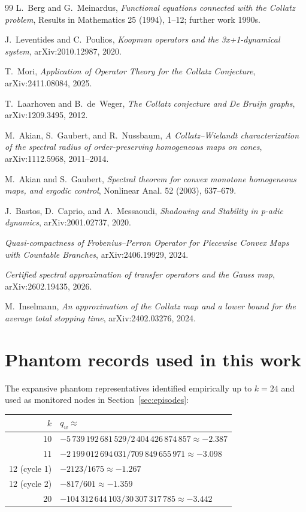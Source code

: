 \documentclass[11pt,a4paper]{article}
\theoremstyle{definition}
\begin{document}
\begin{thebibliography}{99}
L.~Berg and G.~Meinardus,
\emph{Functional equations connected with the Collatz problem},
Results in Mathematics 25 (1994), 1--12; further work 1990s.

J.~Leventides and C.~Poulios,
\emph{Koopman operators and the 3x+1-dynamical system},
arXiv:2010.12987, 2020.

T.~Mori,
\emph{Application of Operator Theory for the Collatz Conjecture},
arXiv:2411.08084, 2025.

T.~Laarhoven and B.~de~Weger,
\emph{The Collatz conjecture and De Bruijn graphs},
arXiv:1209.3495, 2012.

M.~Akian, S.~Gaubert, and R.~Nussbaum,
\emph{A Collatz--Wielandt characterization of the spectral radius
of order-preserving homogeneous maps on cones},
arXiv:1112.5968, 2011--2014.

M.~Akian and S.~Gaubert,
\emph{Spectral theorem for convex monotone homogeneous maps,
and ergodic control},
Nonlinear Anal. 52 (2003), 637--679.

J.~Bastos, D.~Caprio, and A.~Messaoudi,
\emph{Shadowing and Stability in p-adic dynamics},
arXiv:2001.02737, 2020.

\emph{Quasi-compactness of Frobenius--Perron Operator for
Piecewise Convex Maps with Countable Branches},
arXiv:2406.19929, 2024.

\emph{Certified spectral approximation of transfer operators
and the Gauss map},
arXiv:2602.19435, 2026.

M.~Inselmann,
\emph{An approximation of the Collatz map and a lower bound
for the average total stopping time},
arXiv:2402.03276, 2024.

\end{thebibliography}

\appendix

\section{Phantom records used in this work}
\label{app:phantoms}

The expansive phantom representatives identified empirically up to
$k = 24$ and used as monitored nodes in Section~\ref{sec:episodes}:

\begin{center}
\begin{tabular}{rl}
\toprule
$k$ & $q_w \approx$ \\
\midrule
10 & $-5\,739\,192\,681\,529 / 2\,404\,426\,874\,857 \approx -2.387$ \\
11 & $-2\,199\,012\,694\,031 / 709\,849\,655\,971 \approx -3.098$ \\
12 (cycle 1) & $-2123 / 1675 \approx -1.267$ \\
12 (cycle 2) & $-817 / 601 \approx -1.359$ \\
20 & $-104\,312\,644\,103 / 30\,307\,317\,785 \approx -3.442$ \\
\bottomrule
\end{tabular}
\end{center}
\end{document}
